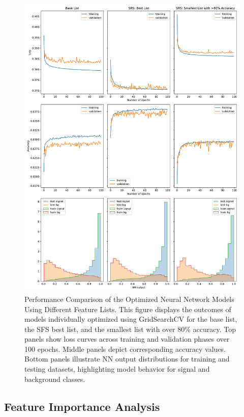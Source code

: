 \documentclass[]{article}
\begin{document}
\begin{figure}[h!]
	\centering
	\includegraphics[width=\linewidth]{best_model/best_models.pdf}
	\caption{Performance Comparison of the Optimized Neural Network Models Using Different Feature Lists. This figure displays the outcomes of models individually optimized using GridSearchCV for the base list, the SFS best list, and the smallest list with over 80\% accuracy. Top panels show loss curves across training and validation phases over 100 epochs. Middle panels depict corresponding accuracy values. Bottom panels illustrate NN output distributions for training and testing datasets, highlighting model behavior for signal and background classes.}
	\label{fig:best_models}
\end{figure}

\clearpage

\subsection{Feature Importance Analysis}
\end{document}

